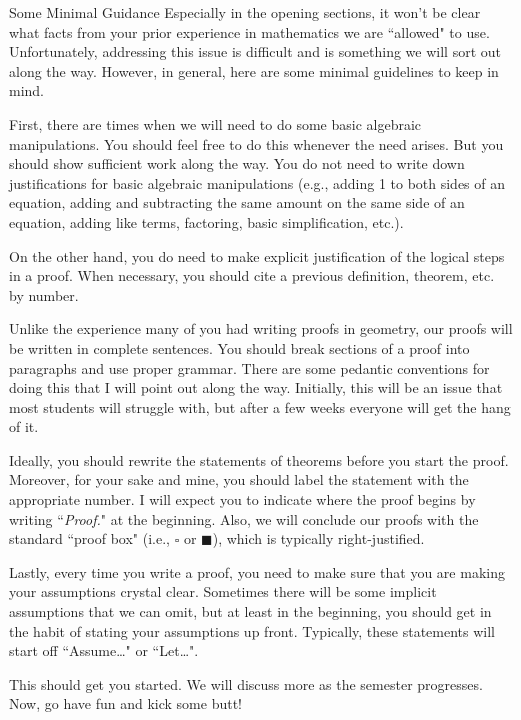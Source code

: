 \begin{section}{Some Minimal Guidance}
Especially in the opening sections, it won't be clear what facts from your prior experience in mathematics we are ``allowed" to use.  Unfortunately, addressing this issue is difficult and is something we will sort out along the way.  However, in general, here are some minimal guidelines to keep in mind.  

First, there are times when we will need to do some basic algebraic manipulations.  You should feel free to do this whenever the need arises.  But you should show sufficient work along the way.  You do not need to write down justifications for basic algebraic manipulations (e.g., adding 1 to both sides of an equation, adding and subtracting the same amount on the same side of an equation, adding like terms, factoring, basic simplification, etc.).  

On the other hand, you do need to make explicit justification of the logical steps in a proof.  When necessary, you should cite a previous definition, theorem, etc. by number.

Unlike the experience many of you had writing proofs in geometry, our proofs will be written in complete sentences.  You should break sections of a proof into paragraphs and use proper grammar.  There are some pedantic conventions for doing this that I will point out along the way.  Initially, this will be an issue that most students will struggle with, but after a few weeks everyone will get the hang of it.

Ideally, you should rewrite the statements of theorems before you start the proof.  Moreover, for your sake and mine, you should label the statement with the appropriate number.  I will expect you to indicate where the proof begins by writing ``\emph{Proof.}" at the beginning.  Also, we will conclude our proofs with the standard ``proof box" (i.e., $\square$ or $\blacksquare$), which is typically right-justified.

Lastly, every time you write a proof, you need to make sure that you are making your assumptions crystal clear.  Sometimes there will be some implicit assumptions that we can omit, but at least in the beginning, you should get in the habit of stating your assumptions up front.  Typically, these statements will start off ``Assume\ldots" or ``Let\ldots".  

This should get you started.  We will discuss more as the semester progresses.  Now, go have fun and kick some butt!

\end{section}